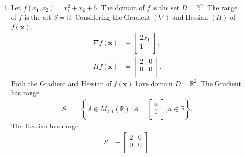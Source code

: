 \documentclass[a4paper,11pt]{article}
\newcommand{\ds}{\displaystyle}
\begin{document}
{{\begin{enumerate}[leftmargin=*]
\begin{enumerate}[label=\alph*)]
			\item Let $\ds{f(x_1,x_2) = x_1^2 + x_2 + 6}$. The domain of $\ds{f}$ is the set  $\ds{D = \mathbb{R}^2}$. The range of $\ds{f}$ is the set $\ds{S = \mathbb{R}}$. Considering the Gradient $\ds{(\nabla)}$ and Hessian $\ds{(H)}$ of $\ds{f(\mathbf{x})}$, 
				\begin{align*}
					\nabla f(\mathbf{x}) & = 
					\begin{bmatrix}
						2x_1 \\
						1 \\
					\end{bmatrix}, \\
					Hf(\mathbf{x}) & = 
					\begin{bmatrix}
						2 & 0 \\
						0 & 0 \\
					\end{bmatrix}.
				\end{align*}
				Both the Gradient and Hessian of $\ds{f(\mathbf{x})}$ have domain $\ds{D = \mathbb{R}^2}$. The Gradient has range 
				\begin{align*} S & = \left\{A \in M_{2,1}(\mathbb{R}) : A =
						\begin{bmatrix}
							a \\
							1 \\
						\end{bmatrix},
					a \in \mathbb{R}\right\}.
				\end{align*}
				The Hessian has range
				\begin{align*} S & = 
					\begin{bmatrix}
						2 & 0 \\
						0 & 0 \\
					\end{bmatrix}.
				\end{align*}


\end{enumerate}
\end{enumerate}}}
\end{document}
